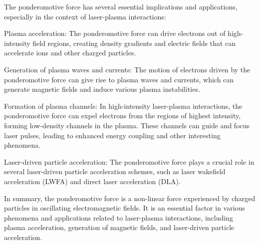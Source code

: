 The ponderomotive force has several essential implications and applications, especially in the context of laser-plasma interactions:

Plasma acceleration: The ponderomotive force can drive electrons out of high-intensity field regions, creating density gradients and electric fields that can accelerate ions and other charged particles.

Generation of plasma waves and currents: The motion of electrons driven by the ponderomotive force can give rise to plasma waves and currents, which can generate magnetic fields and induce various plasma instabilities.

Formation of plasma channels: In high-intensity laser-plasma interactions, the ponderomotive force can expel electrons from the regions of highest intensity, forming low-density channels in the plasma. These channels can guide and focus laser pulses, leading to enhanced energy coupling and other interesting phenomena.

Laser-driven particle acceleration: The ponderomotive force plays a crucial role in several laser-driven particle acceleration schemes, such as laser wakefield acceleration (LWFA) and direct laser acceleration (DLA).

In summary, the ponderomotive force is a non-linear force experienced by charged particles in oscillating electromagnetic fields. It is an essential factor in various phenomena and applications related to laser-plasma interactions, including plasma acceleration, generation of magnetic fields, and laser-driven particle acceleration.